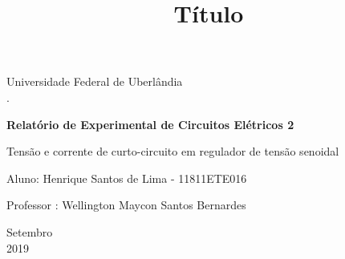 \documentclass[a4paper, 12pt]{article}
\begin{document}
\begin{titlepage}
	\begin{center}
	

		\Huge{Universidade Federal de Uberlândia}\\
	.\vspace{15pt}
        
        \vspace{85pt}
        
		\textbf{\LARGE{Relatório de Experimental de Circuitos Elétricos 2}}
		\title{\large{Título}}
			
	\end{center}
\vspace{1,5cm}
	
	\begin{flushright}

   \begin{list}{}{
      \setlength{\leftmargin}{4.5cm}
      \setlength{\rightmargin}{0cm}
      \setlength{\labelwidth}{0pt}
      \setlength{\labelsep}{\leftmargin}}

      \item 
      Tensão e corrente de curto-circuito em regulador de tensão senoidal

      \begin{list}{}{
      \setlength{\leftmargin}{0cm}
      \setlength{\rightmargin}{0cm}
      \setlength{\labelwidth}{0pt}
      \setlength{\labelsep}{\leftmargin}}

			\item Aluno:  Henrique Santos de Lima - 11811ETE016\
            \item Professor : Wellington Maycon Santos Bernardes\
      		

      \end{list}
   \end{list}
\end{flushright}
\vspace{1cm}
\begin{center}
		\vspace{\fill}
			 Setembro\\
		 2019
			\end{center}
\end{titlepage}
\end{document}
